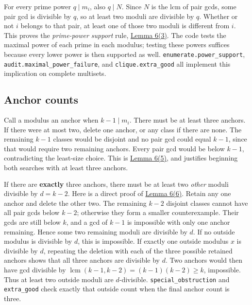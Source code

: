 \documentclass[11pt,a4paper]{article}
\begin{document}
For every prime power \(q\mid m_i\), also \(q\mid N\). Since \(N\) is the lcm of pair gcds, some pair gcd is divisible by \(q\), so at least two moduli are divisible by \(q\). Whether or not \(i\) belongs to that pair, at least one of those two moduli is different from \(i\). This proves the \emph{prime-power support} rule, \href{https://arxiv.org/pdf/math/0604347v2}{Lemma 6(3)}. The code tests the maximal power of each prime in each modulus; testing these powers suffices because every lower power is then supported as well. \texttt{enumerate.power\_support}, \texttt{audit.maximal\_power\_failure}, and \texttt{clique.extra\_good} all implement this implication on complete multisets.

\subsection{Anchor counts}\label{anchor-counts}

Call a modulus an anchor when \(k-1\mid m_i\). There must be at least three anchors. If there were at most two, delete one anchor, or any class if there are none. The remaining \(k-1\) classes would be disjoint and no pair gcd could equal \(k-1\), since that would require two remaining anchors. Every pair gcd would be below \(k-1\), contradicting the least-size choice. This is \href{https://arxiv.org/pdf/math/0604347v2}{Lemma 6(5)}, and justifies beginning both searches with at least three anchors.

If there are \textbf{exactly} three anchors, there must be at least two \emph{other} moduli divisible by \(d=k-2\). Here is a direct proof of \href{https://arxiv.org/pdf/math/0604347v2}{Lemma 6(6)}. Retain any one anchor and delete the other two. The remaining \(k-2\) disjoint classes cannot have all pair gcds below \(k-2\); otherwise they form a smaller counterexample. Their gcds are still below \(k\), and a gcd of \(k-1\) is impossible with only one anchor remaining. Hence some two remaining moduli are divisible by \(d\). If no outside modulus is divisible by \(d\), this is impossible. If exactly one outside modulus \(x\) is divisible by \(d\), repeating the deletion with each of the three possible retained anchors shows that all three anchors are divisible by \(d\). Two anchors would then have gcd divisible by \(\operatorname{lcm}(k-1,k-2)=(k-1)(k-2)\ge k\), impossible. Thus at least two outside moduli are \(d\)-divisible. \texttt{special\_obstruction} and \texttt{extra\_good} check exactly that outside count when the final anchor count is three.
\end{document}
